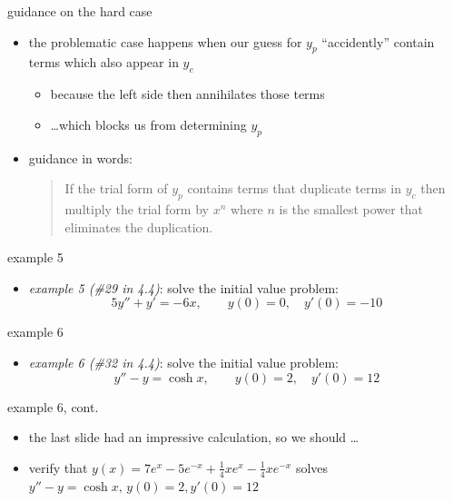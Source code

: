 \documentclass{beamer}
\begin{document}
\begin{frame}{guidance on the hard case}

\begin{itemize}
\item the problematic case happens when our guess for $y_p$ ``accidently'' contain terms which also appear in $y_c$
    \begin{itemize}
    \item because the left side then annihilates those terms
    \item \dots which blocks us from determining $y_p$
    \end{itemize}

\bigskip
\item guidance in words:

\begin{quotation}
\noindent \alert{If the trial form of $y_p$ contains terms that duplicate terms in $y_c$ then multiply the trial form by $x^n$ where $n$ is the smallest power that eliminates the duplication.}
\end{quotation}
\end{itemize}
\end{frame}


\begin{frame}{example 5}

\begin{itemize}
\item \emph{example 5 (\#29 in 4.4)}: solve the initial value problem:
    $$5 y'' + y' = -6 x, \qquad y(0) = 0, \quad y'(0)=-10$$
\end{itemize}

\vspace{60mm}
\end{frame}


\begin{frame}{example 6}

\begin{itemize}
\item \emph{example 6 (\#32 in 4.4)}: solve the initial value problem:
    $$y'' - y = \cosh x, \qquad y(0) = 2, \quad y'(0)=12$$
\end{itemize}

\vspace{60mm}
\end{frame}


\begin{frame}{example 6, cont.}

\begin{itemize}
\item the last slide had an impressive calculation, so we should \dots
\item verify that $y(x)=7 e^x - 5 e^{-x} + \frac{1}{4} x e^x - \frac{1}{4} x e^{-x}$ solves\, $y'' - y = \cosh x,\, y(0) = 2, y'(0)=12$
\end{itemize}

\vspace{55mm}
\end{frame}
\end{document}
